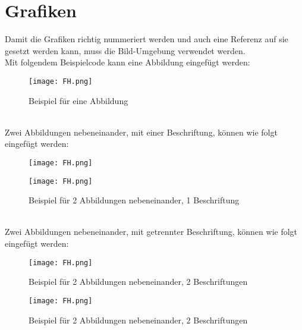 \section{Grafiken}
Damit die Grafiken richtig nummeriert werden und auch eine Referenz auf sie gesetzt werden kann, muss die Bild-Umgebung verwendet werden.\\
Mit folgendem Beispielcode kann eine Abbildung eingefügt werden:
\begin{figure}[h]
    \centering
    \texttt{[image: FH.png]}
    \caption{Beispiel für eine Abbildung}
    \label{fig: Beispielabbildung}
\end{figure}\\
Zwei Abbildungen nebeneinander, mit einer Beschriftung, können wie folgt eingefügt werden:
\begin{figure}[htp!]
    \begin{minipage}[t]{0.49\textwidth}
        \centering
        \texttt{[image: FH.png]}
    \end{minipage}
    \hfill
    \begin{minipage}[t]{0.49\textwidth}
        \centering
        \texttt{[image: FH.png]}
    \end{minipage}
    \caption{Beispiel für 2 Abbildungen nebeneinander, 1 Beschriftung}
    \label{fig: Beispielabbildung-2}
\end{figure}\\
Zwei Abbildungen nebeneinander, mit getrennter Beschriftung, können wie folgt eingefügt werden:
\begin{figure}[htp!]
    \begin{minipage}[t]{0.49\textwidth}
        \centering
        \texttt{[image: FH.png]}
        \caption{Beispiel für 2 Abbildungen nebeneinander, 2 Beschriftungen}
        \label{fig: Beispielabbildung-3}
    \end{minipage}
    \hfill
    \begin{minipage}[t]{0.49\textwidth}
        \centering
        \texttt{[image: FH.png]}
        \caption{Beispiel für 2 Abbildungen nebeneinander, 2 Beschriftungen}
        \label{fig: Beispielabbildung-4}
    \end{minipage}
\end{figure}\\

\newpage

